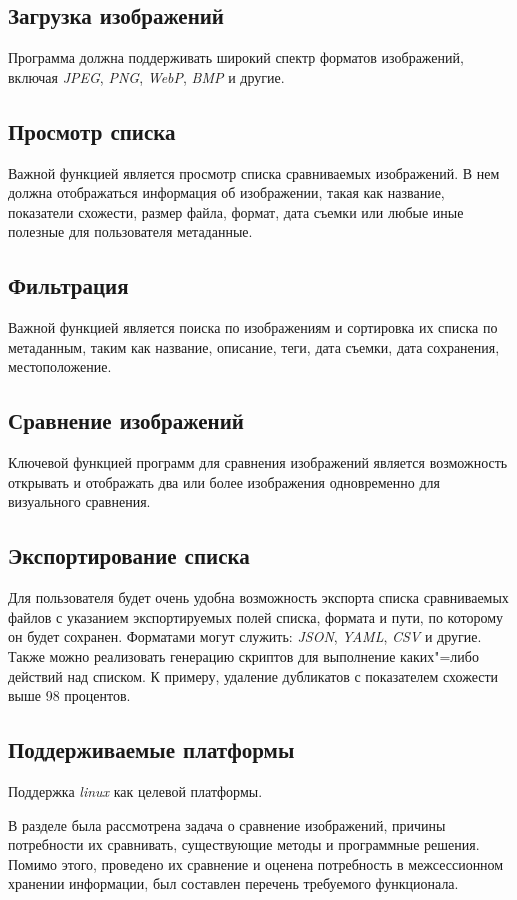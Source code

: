 \subsection{Загрузка изображений}
Программа должна поддерживать широкий спектр форматов изображений, включая
\textit{JPEG}, \textit{PNG}, \textit{WebP}, \textit{BMP} и другие.

\subsection{Просмотр списка}
Важной функцией является просмотр списка сравниваемых изображений. В нем должна
отображаться информация об изображении, такая как название, показатели схожести,
размер файла, формат, дата съемки или любые иные полезные для пользователя
метаданные.

\subsection{Фильтрация}
Важной функцией является поиска по изображениям и сортировка их списка по
метаданным, таким как название, описание, теги, дата съемки, дата сохранения,
местоположение.

\subsection{Сравнение изображений}
Ключевой функцией программ для сравнения изображений является возможность
открывать и отображать два или более изображения одновременно для визуального
сравнения.

\subsection{Экспортирование списка}
Для пользователя будет очень удобна возможность экспорта списка сравниваемых
файлов с указанием экспортируемых полей списка, формата и пути, по которому он
будет сохранен. Форматами могут служить: \textit{JSON}, \textit{YAML},
\textit{CSV} и другие. Также можно реализовать генерацию скриптов для выполнение
каких"=либо действий над списком. К примеру, удаление дубликатов с показателем
схожести выше 98 процентов.

\subsection{Поддерживаемые платформы}
Поддержка \textit{linux} как целевой платформы.

\vspace{\baselineskip}

В разделе была рассмотрена задача о сравнение изображений, причины потребности
их сравнивать, существующие методы и программные решения. Помимо этого,
проведено их сравнение и оценена потребность в межсессионном хранении
информации, был составлен перечень требуемого функционала.
